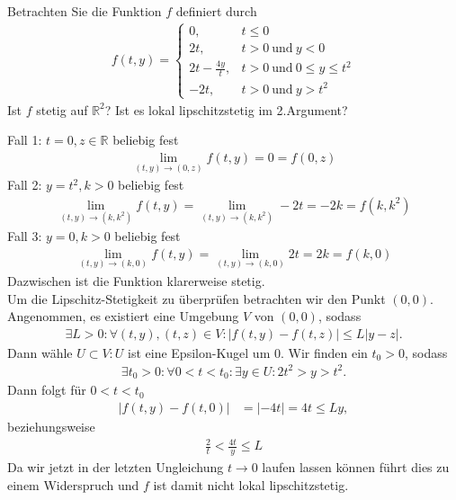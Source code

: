 \begin{exercise}
Betrachten Sie die Funktion $f$ definiert durch
\begin{align*}
  f(t,y) = \begin{cases}
    0, & t \leq 0 \\
    2t, & t > 0 ~\text{und}~ y < 0 \\
    2t - \frac{4y}{t}, & t > 0 ~\text{und}~ 0 \leq y \leq t^2 \\
    -2t, & t > 0 ~\text{und}~ y > t^2
  \end{cases}
\end{align*}
Ist $f$ stetig auf $\mathbb{R}^2$?  Ist es lokal lipschitzstetig im 2.Argument?
\end{exercise}
\begin{solution}
Fall 1: $t = 0, z \in \mathbb{R}$ beliebig fest
\begin{align*}
  \lim_{(t,y) \rightarrow (0,z)}f(t,y) = 0 = f(0,z)
\end{align*}
Fall 2: $y = t^2, k > 0$ beliebig fest
\begin{align*}
  \lim_{(t,y) \rightarrow (k,k^{2})} f(t,y) = \lim_{(t,y) \rightarrow (k,k^{2})} -2t = -2k = f(k,k^2)
\end{align*}
Fall 3: $y = 0, k > 0$ beliebig fest
\begin{align*}
  \lim_{(t,y) \rightarrow (k,0)} f(t,y) = \lim_{(t,y) \rightarrow (k,0)} 2t = 2k = f(k,0)
\end{align*}
Dazwischen ist die Funktion klarerweise stetig. \\
Um die Lipschitz-Stetigkeit zu überprüfen betrachten wir den Punkt $(0,0)$. \\
Angenommen, es existiert eine Umgebung $V$ von $(0,0)$, sodass
\begin{align*}
  \exists L > 0: \forall (t,y),(t,z) \in V: |f(t,y) - f(t,z)| \leq L|y-z|.
\end{align*}
Dann wähle $U \subset V: U$ ist eine Epsilon-Kugel um 0.
Wir finden ein $t_0 > 0$, sodass
\begin{align*}
  \exists t_0 > 0: \forall 0 < t < t_0: \exists y \in U: 2t^2 > y > t^2.
\end{align*}
Dann folgt für $0 < t < t_0$
\begin{align*}
  |f(t,y) - f(t,0)| &= |-4t| = 4t \leq Ly,
\end{align*}
beziehungsweise
\begin{align*}
  \frac{2}{t} < \frac{4t}{y} \leq L
\end{align*}
Da wir jetzt in der letzten Ungleichung $t \rightarrow 0$ laufen lassen können
führt dies zu einem Widerspruch und $f$ ist damit nicht lokal lipschitzstetig.
\end{solution}
